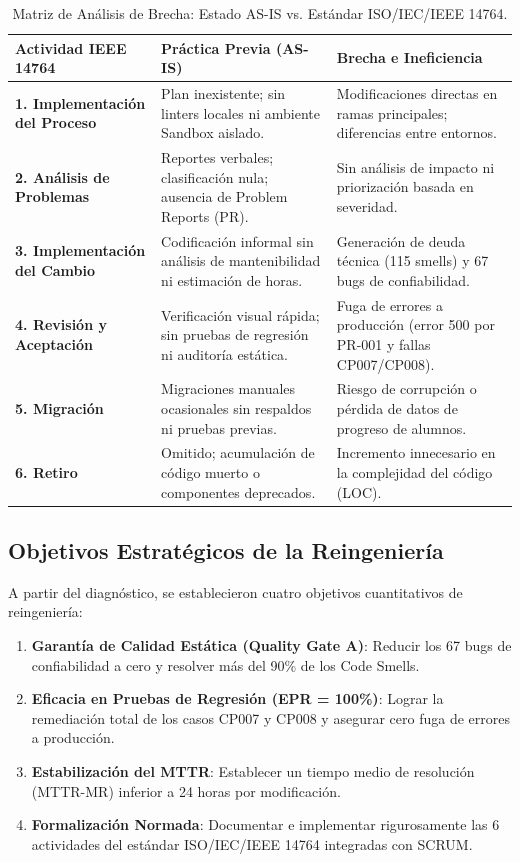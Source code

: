 \documentclass[12pt]{article}
\begin{document}
\begin{table}[H]
    \centering
    \caption{Matriz de Análisis de Brecha: Estado AS-IS vs. Estándar ISO/IEC/IEEE 14764.}
    \label{tab:gap_analysis}
    \small
    \color{black}
    \begin{tabularx}{\textwidth}{p{3.2cm}XX}
        \toprule
        \textbf{Actividad IEEE 14764} & \textbf{Práctica Previa (AS-IS)} & \textbf{Brecha e Ineficiencia} \\
        \midrule
        \textbf{1. Implementación del Proceso} & Plan inexistente; sin linters locales ni ambiente Sandbox aislado. & Modificaciones directas en ramas principales; diferencias entre entornos. \\
        \rowcolor{darkcard}
        \textbf{2. Análisis de Problemas} & Reportes verbales; clasificación nula; ausencia de Problem Reports (PR). & Sin análisis de impacto ni priorización basada en severidad. \\
        \textbf{3. Implementación del Cambio} & Codificación informal sin análisis de mantenibilidad ni estimación de horas. & Generación de deuda técnica (115 smells) y 67 bugs de confiabilidad. \\
        \rowcolor{darkcard}
        \textbf{4. Revisión y Aceptación} & Verificación visual rápida; sin pruebas de regresión ni auditoría estática. & Fuga de errores a producción (error 500 por PR-001 y fallas CP007/CP008). \\
        \textbf{5. Migración} & Migraciones manuales ocasionales sin respaldos ni pruebas previas. & Riesgo de corrupción o pérdida de datos de progreso de alumnos. \\
        \rowcolor{darkcard}
        \textbf{6. Retiro} & Omitido; acumulación de código muerto o componentes deprecados. & Incremento innecesario en la complejidad del código (LOC). \\
        \bottomrule
    \end{tabularx}
\end{table}

\subsection{Objetivos Estratégicos de la Reingeniería}
A partir del diagnóstico, se establecieron cuatro objetivos cuantitativos de reingeniería:
\begin{enumerate}
    \item \textbf{Garantía de Calidad Estática (Quality Gate A)}: Reducir los 67 bugs de confiabilidad a cero y resolver más del 90\% de los Code Smells.
    \item \textbf{Eficacia en Pruebas de Regresión (EPR = 100\%)}: Lograr la remediación total de los casos CP007 y CP008 y asegurar cero fuga de errores a producción.
    \item \textbf{Estabilización del MTTR}: Establecer un tiempo medio de resolución (MTTR-MR) inferior a 24 horas por modificación.
    \item \textbf{Formalización Normada}: Documentar e implementar rigurosamente las 6 actividades del estándar ISO/IEC/IEEE 14764 integradas con SCRUM.
\end{enumerate}
\end{document}
